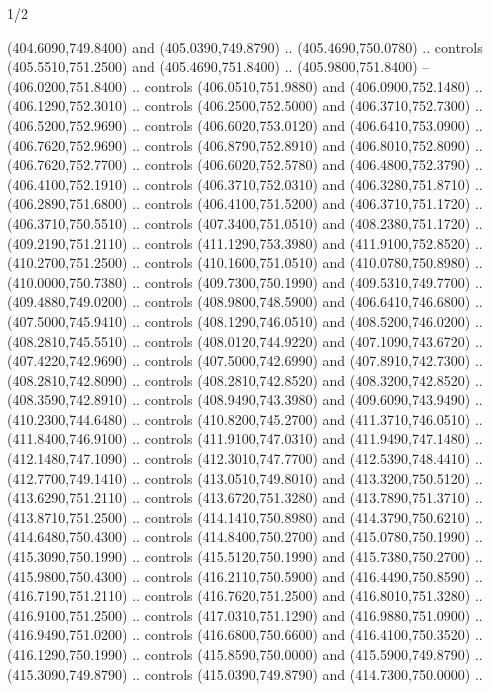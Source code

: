 \begin{flagdescription}{1/2}
\begin{scope}[xshift=0.5\flaglength]
\begin{scope}[scale=0.00745\flagwidth,xshift=-12.1mm,yshift=41.7mm]
\begin{scope}[y=0.80pt, x=0.80pt, yscale=-1, xscale=1, inner sep=0pt, outer sep=0pt]
\begin{scope}[cm={{1.33333,0.0,0.0,-1.33333,(0.0,114.66667)}}]
\begin{scope}[scale=0.100]
  (404.6090,749.8400) and (405.0390,749.8790) .. (405.4690,750.0780) .. controls
  (405.5510,751.2500) and (405.4690,751.8400) .. (405.9800,751.8400) --
  (406.0200,751.8400) .. controls (406.0510,751.9880) and (406.0900,752.1480) ..
  (406.1290,752.3010) .. controls (406.2500,752.5000) and (406.3710,752.7300) ..
  (406.5200,752.9690) .. controls (406.6020,753.0120) and (406.6410,753.0900) ..
  (406.7620,752.9690) .. controls (406.8790,752.8910) and (406.8010,752.8090) ..
  (406.7620,752.7700) .. controls (406.6020,752.5780) and (406.4800,752.3790) ..
  (406.4100,752.1910) .. controls (406.3710,752.0310) and (406.3280,751.8710) ..
  (406.2890,751.6800) .. controls (406.4100,751.5200) and (406.3710,751.1720) ..
  (406.3710,750.5510) .. controls (407.3400,751.0510) and (408.2380,751.1720) ..
  (409.2190,751.2110) .. controls (411.1290,753.3980) and (411.9100,752.8520) ..
  (410.2700,751.2500) .. controls (410.1600,751.0510) and (410.0780,750.8980) ..
  (410.0000,750.7380) .. controls (409.7300,750.1990) and (409.5310,749.7700) ..
  (409.4880,749.0200) .. controls (408.9800,748.5900) and (406.6410,746.6800) ..
  (407.5000,745.9410) .. controls (408.1290,746.0510) and (408.5200,746.0200) ..
  (408.2810,745.5510) .. controls (408.0120,744.9220) and (407.1090,743.6720) ..
  (407.4220,742.9690) .. controls (407.5000,742.6990) and (407.8910,742.7300) ..
  (408.2810,742.8090) .. controls (408.2810,742.8520) and (408.3200,742.8520) ..
  (408.3590,742.8910) .. controls (408.9490,743.3980) and (409.6090,743.9490) ..
  (410.2300,744.6480) .. controls (410.8200,745.2700) and (411.3710,746.0510) ..
  (411.8400,746.9100) .. controls (411.9100,747.0310) and (411.9490,747.1480) ..
  (412.1480,747.1090) .. controls (412.3010,747.7700) and (412.5390,748.4410) ..
  (412.7700,749.1410) .. controls (413.0510,749.8010) and (413.3200,750.5120) ..
  (413.6290,751.2110) .. controls (413.6720,751.3280) and (413.7890,751.3710) ..
  (413.8710,751.2500) .. controls (414.1410,750.8980) and (414.3790,750.6210) ..
  (414.6480,750.4300) .. controls (414.8400,750.2700) and (415.0780,750.1990) ..
  (415.3090,750.1990) .. controls (415.5120,750.1990) and (415.7380,750.2700) ..
  (415.9800,750.4300) .. controls (416.2110,750.5900) and (416.4490,750.8590) ..
  (416.7190,751.2110) .. controls (416.7620,751.2500) and (416.8010,751.3280) ..
  (416.9100,751.2500) .. controls (417.0310,751.1290) and (416.9880,751.0900) ..
  (416.9490,751.0200) .. controls (416.6800,750.6600) and (416.4100,750.3520) ..
  (416.1290,750.1990) .. controls (415.8590,750.0000) and (415.5900,749.8790) ..
  (415.3090,749.8790) .. controls (415.0390,749.8790) and (414.7300,750.0000) ..

\end{scope}
\end{scope}
\end{scope}
\end{scope}
\end{scope}
\end{flagdescription}

